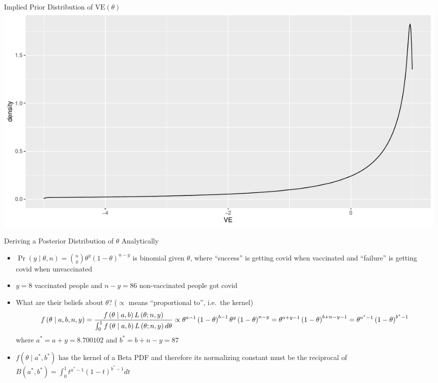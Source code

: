 \documentclass[
  ignorenonframetext,
]{beamer}
\providecommand{\tightlist}{%
  \setlength{\itemsep}{0pt}\setlength{\parskip}{0pt}}
\begin{document}
\begin{frame}{Implied Prior Distribution of
\(\mbox{VE}\left(\theta\right)\)}
\protect\hypertarget{implied-prior-distribution-of-mboxveleftthetaright}{}
\includegraphics{Slides04_files/figure-beamer/prior-1.pdf}
\end{frame}

\begin{frame}{Deriving a Posterior Distribution of \(\theta\)
Analytically}
\protect\hypertarget{deriving-a-posterior-distribution-of-theta-analytically}{}
\begin{itemize}
\tightlist
\item
  \(\Pr\left(y \mid \theta, n\right) = {n \choose y} \theta^y \left(1 - \theta\right)^{n - y}\)
  is binomial given \(\theta\), where ``success'' is getting covid when
  vaccinated and ``failure'' is getting covid when unvaccinated
\item
  \(y = 8\) vaccinated people and \(n - y = 86\) non-vaccinated people
  got covid
\end{itemize}

\begin{itemize}[<+->]
\tightlist
\item
  What are their beliefs about \(\theta\)? (\(\propto\) means
  ``proportional to'', i.e.~the kernel)
  \[f\left(\theta \mid a,b,n,y\right) = \frac{f\left(\theta \mid a,b\right) L\left(\theta;n,y\right)}
  {\int_0^1 f\left(\theta \mid a,b\right) L\left(\theta;n,y\right) d\theta} \propto \\
  \theta^{a - 1} \left(1 - \theta\right)^{b - 1} \theta^{y}\left(1-\theta\right)^{n-y}
  = \theta^{a + y - 1} \left(1 - \theta\right)^{b + n - y - 1} = \theta^{a^\ast - 1} \left(1 - \theta\right)^{b^\ast - 1}\]
  where \(a^{\ast}=a+y = 8.700102\) and \(b^{\ast}=b+n-y = 87\)
\item
  \(f\left(\theta \mid a^\ast,b^\ast\right)\) has the kernel of a Beta
  PDF and therefore its normalizing constant must be the reciprocal of
  \(B\left(a^\ast,b^\ast\right) = \int_0^1 t^{a^\ast - 1} \left(1 - t\right)^{b^\ast - 1} dt\)
\end{itemize}
\end{frame}
\end{document}
